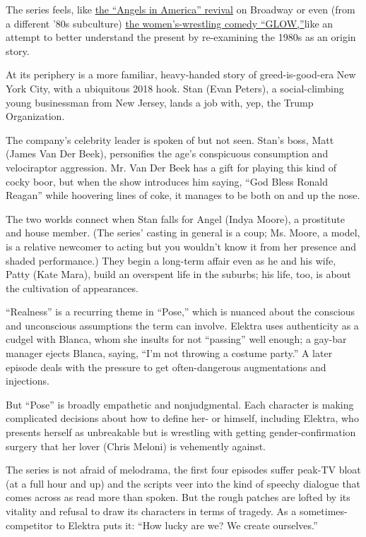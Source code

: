 The series feels, like
\href{https://www.nytimes3xbfgragh.onion/2018/03/25/theater/angels-in-america-review-nathan-lane-andrew-garfield.html}{the
``Angels in America'' revival} on Broadway or even (from a different
'80s subculture)
\href{https://www.nytimes3xbfgragh.onion/2017/06/22/arts/television/glow-netflix-tv-review.html}{the
women's-wrestling comedy ``GLOW,''}like an attempt to better understand
the present by re-examining the 1980s as an origin story.

At its periphery is a more familiar, heavy-handed story of
greed-is-good-era New York City, with a ubiquitous 2018 hook. Stan (Evan
Peters), a social-climbing young businessman from New Jersey, lands a
job with, yep, the Trump Organization.

The company's celebrity leader is spoken of but not seen. Stan's boss,
Matt (James Van Der Beek), personifies the age's conspicuous consumption
and velociraptor aggression. Mr. Van Der Beek has a gift for playing
this kind of cocky boor, but when the show introduces him saying, ``God
Bless Ronald Reagan'' while hoovering lines of coke, it manages to be
both on and up the nose.

The two worlds connect when Stan falls for Angel (Indya Moore), a
prostitute and house member. (The series' casting in general is a coup;
Ms. Moore, a model, is a relative newcomer to acting but you wouldn't
know it from her presence and shaded performance.) They begin a
long-term affair even as he and his wife, Patty (Kate Mara), build an
overspent life in the suburbs; his life, too, is about the cultivation
of appearances.

``Realness'' is a recurring theme in ``Pose,'' which is nuanced about
the conscious and unconscious assumptions the term can involve. Elektra
uses authenticity as a cudgel with Blanca, whom she insults for not
``passing'' well enough; a gay-bar manager ejects Blanca, saying, ``I'm
not throwing a costume party.'' A later episode deals with the pressure
to get often-dangerous augmentations and injections.

But ``Pose'' is broadly empathetic and nonjudgmental. Each character is
making complicated decisions about how to define her- or himself,
including Elektra, who presents herself as unbreakable but is wrestling
with getting gender-confirmation surgery that her lover (Chris Meloni)
is vehemently against.

The series is not afraid of melodrama, the first four episodes suffer
peak-TV bloat (at a full hour and up) and the scripts veer into the kind
of speechy dialogue that comes across as read more than spoken. But the
rough patches are lofted by its vitality and refusal to draw its
characters in terms of tragedy. As a sometimes-competitor to Elektra
puts it: ``How lucky are we? We create ourselves.''

